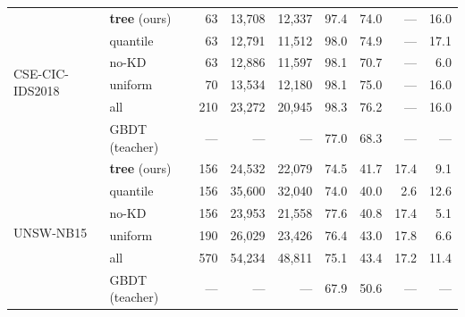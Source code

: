 \begin{table}[!ht]
{\begin{tabular}{l l r r r r r r r}
\midrule
\multirow{6}{*}{CSE-CIC-IDS2018}
& \textbf{tree} (ours) & 63 & 13,708 & 12,337 & 97.4 & 74.0 & --- & 16.0 \\
& quantile & 63 & 12,791 & 11,512 & 98.0 & 74.9 & --- & 17.1 \\
& no-KD & 63 & 12,886 & 11,597 & 98.1 & 70.7 & --- & 6.0 \\
& uniform & 70 & 13,534 & 12,180 & 98.1 & 75.0 & --- & 16.0 \\
& all & 210 & 23,272 & 20,945 & 98.3 & 76.2 & --- & 16.0 \\
& GBDT (teacher) & --- & --- & --- & 77.0 & 68.3 & --- & --- \\
\midrule
\multirow{6}{*}{UNSW-NB15}
& \textbf{tree} (ours) & 156 & 24,532 & 22,079 & 74.5 & 41.7 & 17.4 & 9.1 \\
& quantile & 156 & 35,600 & 32,040 & 74.0 & 40.0 & 2.6 & 12.6 \\
& no-KD & 156 & 23,953 & 21,558 & 77.6 & 40.8 & 17.4 & 5.1 \\
& uniform & 190 & 26,029 & 23,426 & 76.4 & 43.0 & 17.8 & 6.6 \\
& all & 570 & 54,234 & 48,811 & 75.1 & 43.4 & 17.2 & 11.4 \\
& GBDT (teacher) & --- & --- & --- & 67.9 & 50.6 & --- & --- \\
\bottomrule
\end{tabular}}
\end{table}
